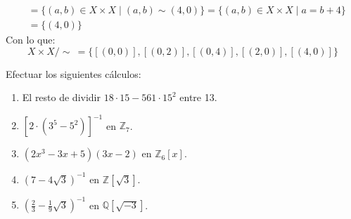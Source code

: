 \documentclass[12pt]{article}
\begin{document}
\begin{ejercicio}[3 puntos]
\begin{enumerate}[label=(\alph*)]
\begin{align*}
                    [(4,0)] &= \{(a,b)\in X\times X \mid (a,b)\sim(4,0)\} = \{(a,b)\in X\times X \mid a = b+4\} \\
                            &= \{(4,0)\} 
                \end{align*}
                Con lo que:
                \begin{equation*}
                    X\times X/\sim\ = \{[(0,0)], [(0,2)], [(0,4)], [(2,0)], [(4,0)]\}
                \end{equation*}
        \end{enumerate}
    \end{ejercicio}

    \begin{ejercicio}[4 puntos]
        Efectuar los siguientes cálculos:
        \begin{enumerate}[label=(\alph*)]
            \item El resto de dividir $18\cdot 15-561\cdot 15^2$ entre 13.
            \item ${[2\cdot (3^5 - 5^2)]}^{-1}$ en $\mathbb{Z}_7$.
            \item $(2x^3-3x+5)(3x-2)$ en $\mathbb{Z}_6[x]$.
            \item ${\left(7-4\sqrt{3}\right)}^{-1}$ en $\mathbb{Z}\left[\sqrt{3}\right]$.
            \item ${\left(\frac{2}{3}-\frac{1}{9}\sqrt{3}\right)}^{-1}$ en $\mathbb{Q}\left[\sqrt{-3}\right]$.
        \end{enumerate}~\\


\end{ejercicio}
\end{document}
